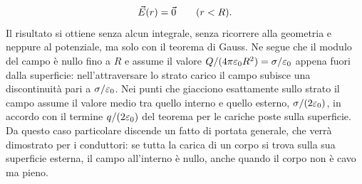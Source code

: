 \documentclass[11pt,a4paper]{article}
\begin{document}
\begin{equation}
\vec{E}(r)=\vec{0}\qquad(r<R).
\label{eq:gauss:gusciodentro}
\end{equation}
Il risultato si ottiene senza alcun integrale, senza ricorrere alla geometria e neppure al potenziale, ma solo con il teorema di Gauss. Ne segue che il modulo del campo è nullo fino a $R$ e assume il valore $Q/(4\pi\varepsilon_0 R^2)=\sigma/\varepsilon_0$ appena fuori dalla superficie: nell'attraversare lo strato carico il campo subisce una discontinuità pari a $\sigma/\varepsilon_0$.
Nei punti che giacciono esattamente sullo strato il campo assume il valore medio tra quello interno e quello esterno, $\sigma/(2\varepsilon_0)$, in accordo con il termine $q/(2\varepsilon_0)$ del teorema per le cariche poste sulla superficie. Da questo caso particolare discende un fatto di portata generale, che verrà dimostrato per i conduttori: se tutta la carica di un corpo si trova sulla sua superficie esterna, il campo all'interno è nullo, anche quando il corpo non è cavo ma pieno.
\end{document}
